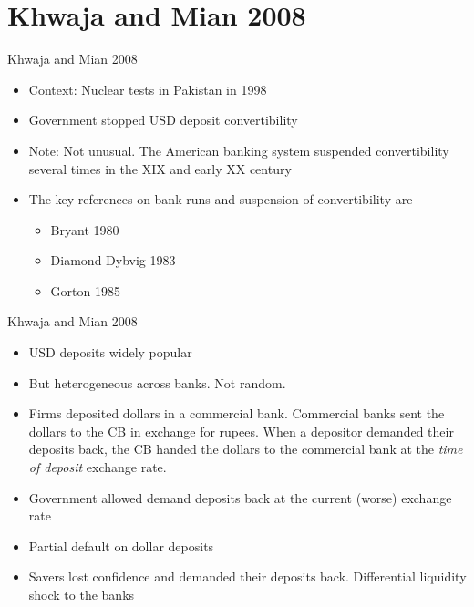 \documentclass[english,xcolor=svgnames]{beamer}
\begin{document}
\section{Khwaja and Mian 2008}
\begin{frame}{Khwaja and Mian 2008}
\begin{itemize}
\item Context: Nuclear tests in Pakistan in 1998
\item Government stopped USD deposit convertibility
\item Note: Not unusual. The American banking system suspended convertibility several times in the XIX and early XX century
\item The key references on bank runs and suspension of convertibility are
\begin{itemize}
\item Bryant 1980
\item Diamond Dybvig 1983
\item Gorton 1985
\end{itemize}
\end{itemize}
\end{frame}


\begin{frame}{Khwaja and Mian 2008}
\begin{itemize}
\item USD deposits widely popular
\item But heterogeneous across banks. Not random.
\item Firms deposited dollars in a commercial bank. Commercial banks sent the dollars to the CB in exchange for rupees. When a depositor demanded their deposits back, the CB handed the dollars to the commercial bank at the \textit{time of deposit} exchange rate.
\item Government allowed demand deposits back at the current (worse) exchange rate
\item Partial default on dollar deposits
\item Savers lost confidence and demanded their deposits back. Differential liquidity shock to the banks
\end{itemize}
\end{frame}
\end{document}
